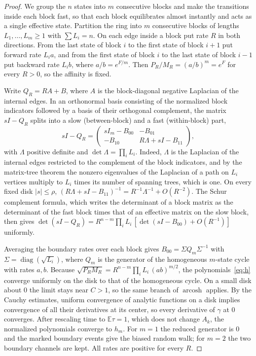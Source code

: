 \documentclass[11pt]{article}
\theoremstyle{remark}
\newcommand{\E}{\mathbb E}
\newcommand{\acosh}{\operatorname{arcosh}}
\begin{document}
\begin{proof}
We group the $n$ states into $m$ consecutive blocks and make the
transitions inside each block fast, so that each block equilibrates almost
instantly and acts as a single effective state. Partition the ring into $m$
consecutive blocks of lengths $L_1,\dots,L_m\ge1$ with $\sum L_i=n$. On
each edge inside a block put rate $R$ in both directions. From the last
state of block $i$ to the first state of block $i+1$ put forward rate
$L_ia$, and from the first state of block $i$ to the last state of block
$i-1$ put backward rate $L_ib$, where $a/b=e^{F/m}$. Then
$P_R/M_R=(a/b)^m=e^F$ for every $R>0$, so the affinity is fixed.

Write $Q_R=RA+B$, where $A$ is the block-diagonal negative Laplacian of the
internal edges. In an orthonormal basis consisting of the normalized block
indicators followed by a basis of their orthogonal complement, the matrix
$sI-Q_R$ splits into a slow (between-block) and a fast (within-block) part,
\[
sI-Q_R=\begin{pmatrix}sI_m-B_{00}&-B_{01}\\-B_{10}&R\Lambda+sI-B_{11}
\end{pmatrix},
\]
with $\Lambda$ positive definite and $\det\Lambda=\prod_iL_i$. Indeed,
$\Lambda$ is the Laplacian of the internal edges restricted to the
complement of the block indicators, and by the matrix-tree theorem the
nonzero eigenvalues of the Laplacian of a path on $L_i$ vertices multiply
to $L_i$ times its number of spanning trees, which is one. On every
fixed disk $|s|\le\rho$, $(R\Lambda+sI-B_{11})^{-1}=R^{-1}\Lambda^{-1}
+O(R^{-2})$. The Schur complement formula, which writes the determinant of
a block matrix as the determinant of the fast block times that of an
effective matrix on the slow block, then gives
$\det(sI-Q_R)=R^{n-m}\prod_iL_i\,[\det(sI-B_{00})+O(R^{-1})]$ uniformly.

Averaging the boundary rates over each block gives
$B_{00}=\Sigma Q_m\Sigma^{-1}$ with $\Sigma=\operatorname{diag}(\sqrt{L_i})$,
where $Q_m$ is the generator of the homogeneous $m$-state cycle with rates
$a,b$. Because $\sqrt{P_RM_R}=R^{n-m}\prod_iL_i\,(ab)^{m/2}$, the
polynomials~\eqref{eq:h} converge uniformly on the disk to that of the
homogeneous cycle. On a small disk about $0$ the limit stays near $C>1$, so
the same branch of $\acosh$ applies. By the Cauchy estimates, uniform
convergence of analytic functions on a disk implies convergence of all
their derivatives at its center, so every derivative of $\gamma$ at $0$
converges. After rescaling time to $\E\tau=1$, which does not change
$A_k$, the normalized polynomials converge to $h_m$. For $m=1$ the reduced
generator is $0$ and the marked boundary events give the biased random
walk; for $m=2$ the two boundary channels are kept. All rates are positive
for every $R$.
\end{proof}
\end{document}
